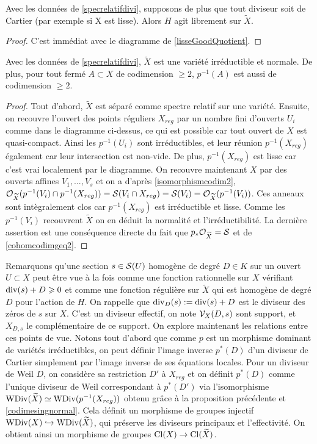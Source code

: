 \begin{prop}
Avec les données de \ref{specrelatifdivi}, supposons de plus que tout diviseur soit de Cartier (par exemple si X est lisse). Alors $H$ agit librement sur $\widetilde{X}$.
\end{prop}
\begin{proof}
C'est immédiat avec le diagramme de \ref{lisseGoodQuotient}.
\end{proof}


\begin{prop}\label{preimagecodim2}
Avec les données de \ref{specrelatifdivi}, $\widetilde{X}$ est une variété irréductible et normale. De plus, pour tout fermé $A\subset X$ de codimension $\geq 2$, $p^{-1}(A)$ est aussi de codimension $\geq 2$.
\end{prop}
\begin{proof}
Tout d'abord, $\widetilde{X}$ est séparé comme spectre relatif sur une variété. Ensuite, on recouvre l'ouvert des points réguliers $X_{reg}$ par un nombre fini d'ouverts $U_i$ comme dans le diagramme ci-dessus, ce qui est possible car tout ouvert de $X$ est quasi-compact. Ainsi les $p^{-1}(U_i)$ sont irréductibles, et leur réunion $p^{-1}(X_{reg})$ également car leur intersection est non-vide. De plus, $p^{-1}(X_{reg})$ est lisse car c'est vrai localement par le diagramme. On recouvre maintenant $X$ par des ouverts affines $V_1,...,V_s$ et on a d'après \ref{isomorphismcodim2}, $\mathcal{O}_{\widetilde{X}}(p^{-1}(V_i)\cap p^{-1}(X_{reg}))=\mathcal{S}(V_i\cap X_{reg})=\mathcal{S}(V_i)=\mathcal{O}_{\widetilde{X}}(p^{-1}(V_i))$. Ces anneaux sont intègralement clos car $p^{-1}(X_{reg})$ est irréductible et lisse. Comme les $p^{-1}(V_i)$ recouvrent $\widetilde{X}$ on en déduit la normalité et l'irréductibilité.
La dernière assertion est une conséquence directe du fait que $p_*\mathcal{O}_{\widetilde{X}}=\mathcal{S}$ et de \ref{cohomcodimgeq2}.
\end{proof}

Remarquons qu'une section $s\in \mathcal{S}(U)$ homogène de degré $D\in K$ sur un ouvert $U\subset X$ peut être vue à la fois comme une fonction rationnelle sur $X$ vérifiant $\operatorname{div}(s)+D\geqslant 0$ et comme une fonction régulière sur $\widetilde{X}$ qui est homogène de degré $D$ pour l'action de $H$. On rappelle que $\operatorname{div}_D(s):=\operatorname{div}(s)+D$ est le diviseur des zéros de $s$ sur $X$. C'est un diviseur effectif, on note $\mathcal{V}_X(D,s)$ sont support, et $X_{D,s}$ le complémentaire de ce support. On explore maintenant les relations entre ces points de vue. Notons tout d'abord que comme $p$ est un morphisme dominant de variétés irréductibles, on peut définir l'image inverse $p^*(D)$ d'un diviseur de Cartier simplement par l'image inverse de ses équations locales. Pour un diviseur de Weil $D$, on considère sa restriction $D'$ à $X_{reg}$ et on définit $p^*(D)$ comme l'unique diviseur de Weil correspondant à $p^*(D')$ via l'isomorphisme $\operatorname{WDiv}(\widetilde{X})\simeq\operatorname{WDiv}(p^{-1}(X_{reg}))$ obtenu grâce à la proposition précédente et \ref{codimesingnormal}. Cela définit un morphisme de groupes injectif $\operatorname{WDiv}(X)\xhookrightarrow{}\operatorname{WDiv}(\widetilde{X})$, qui préserve les diviseurs principaux et l'effectivité. On obtient ainsi un morphisme de groupes $\operatorname{Cl}(X)\rightarrow \operatorname{Cl}(\widetilde{X})$.

